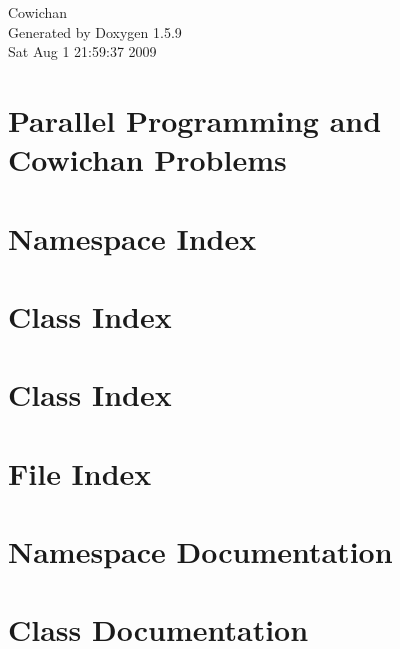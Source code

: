 \documentclass[a4paper]{book}
\begin{document}
\hypersetup{pageanchor=false}
\begin{titlepage}
\vspace*{7cm}
\begin{center}
{\Large Cowichan }\\
\vspace*{1cm}
{\large Generated by Doxygen 1.5.9}\\
\vspace*{0.5cm}
{\small Sat Aug 1 21:59:37 2009}\\
\end{center}
\end{titlepage}
\clearemptydoublepage
{}
\tableofcontents
\clearemptydoublepage
{}
\hypersetup{pageanchor=true}
\chapter{Parallel Programming and Cowichan Problems}
\label{index}\hypertarget{index}{}
\chapter{Namespace Index}

\chapter{Class Index}

\chapter{Class Index}

\chapter{File Index}

\chapter{Namespace Documentation}



\chapter{Class Documentation}


























\end{document}
